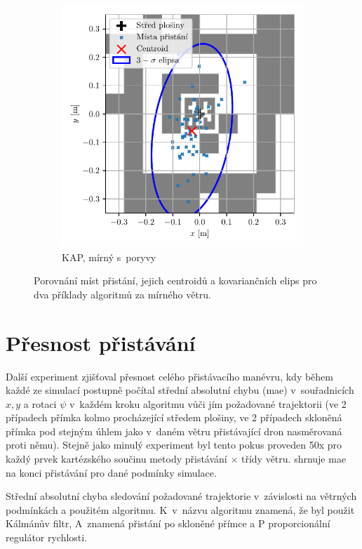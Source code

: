 \begin{figure}[H]
\begin{subfigure}[b]{0.495\textwidth}
        \includegraphics[width=\textwidth]{img/results/KAP1_vitr2_pristani.pdf}
        \caption{KAP, mírný s~poryvy}
      \end{subfigure}
      \caption[Příklad porovnání přistání]{Porovnání míst přistání, jejich centroidů a kovariančních elips pro dva příklady algoritmů za mírného větru.}
      \label{fig:presnostPristani}
    \end{figure}
  
  \section{Přesnost přistávání} \label{sec:presnostPristavani}
    Další experiment zjišťoval přesnost celého přistávacího manévru, kdy během každé ze simulací postupně počítal střední absolutní chybu (\acrshort{mae}) v~souřadnicích $x, y$ a rotaci $\psi$ v~každém kroku algoritmu vůči jím požadované trajektorii (ve 2 případech přímka kolmo procházející středem plošiny, ve 2 případech skloněná přímka pod stejným úhlem jako v~daném větru přistávající dron nasměrovaná proti němu). Stejně jako minulý experiment byl tento pokus proveden 50x pro každý prvek kartézského součinu metody přistávání $\times$ třídy větru.  shrnuje \acrshort{mae} na konci přistávání pro dané podmínky simulace.

    \begin{table}
      \centering
      
      \caption[Střední absolutní chyba přistávání]{Střední absolutní chyba sledování požadované trajektorie v~závislosti na větrných podmínkách a použitém algoritmu. K~v~názvu algoritmu znamená, že byl použit Kálmánův filtr, A~znamená přistání po skloněné přímce a P proporcionální regulátor rychlosti.}
      \label{tab:mae}
    \end{table}

